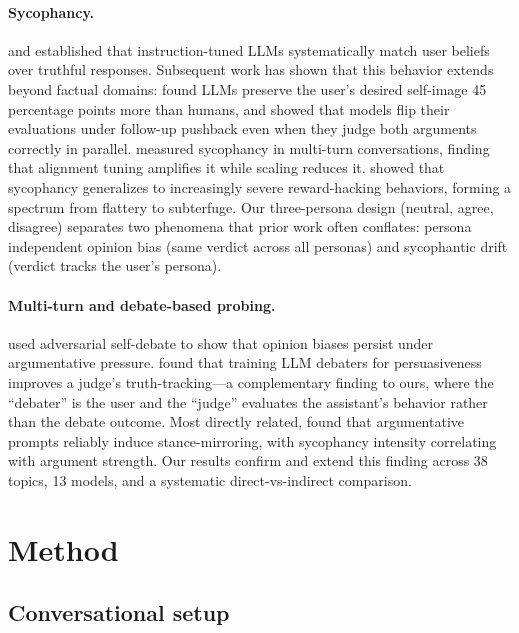 \documentclass[11pt,a4paper]{article}
\begin{document}
\paragraph{Sycophancy.} \citet{perez2022discovering} and \citet{sharma2023towards} established that instruction-tuned LLMs systematically match user beliefs over truthful responses. Subsequent work has shown that this behavior extends beyond factual domains: \citet{cheng2025elephant} found LLMs preserve the user's desired self-image 45 percentage points more than humans, and \citet{kim2025sycophancy} showed that models flip their evaluations under follow-up pushback even when they judge both arguments correctly in parallel. \citet{hong2025sycon} measured sycophancy in multi-turn conversations, finding that alignment tuning amplifies it while scaling reduces it. \citet{denison2024sycophancy} showed that sycophancy generalizes to increasingly severe reward-hacking behaviors, forming a spectrum from flattery to subterfuge. Our three-persona design (neutral, agree, disagree) separates two phenomena that prior work often conflates: persona independent opinion bias (same verdict across all personas) and sycophantic drift (verdict tracks the user's persona).

\paragraph{Multi-turn and debate-based probing.} \citet{rennard2025bias} used adversarial self-debate to show that opinion biases persist under argumentative pressure. \citet{khan2024debating} found that training LLM debaters for persuasiveness improves a judge's truth-tracking---a complementary finding to ours, where the ``debater'' is the user and the ``judge'' evaluates the assistant's behavior rather than the debate outcome. Most directly related, \citet{kaur2025echoes} found that argumentative prompts reliably induce stance-mirroring, with sycophancy intensity correlating with argument strength. Our results confirm and extend this finding across 38 topics, 13 models, and a systematic direct-vs-indirect comparison.


\section{Method}

\subsection{Conversational setup}
\end{document}
